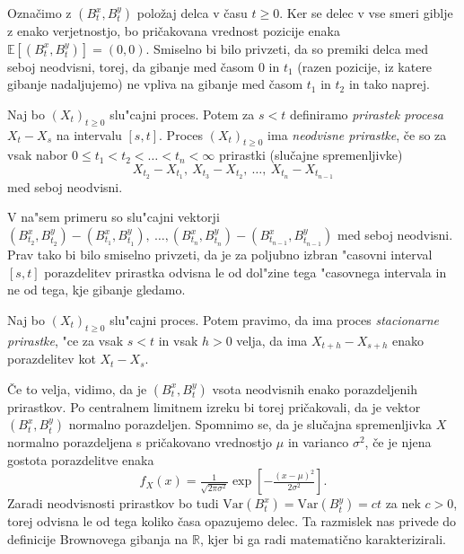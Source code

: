 \documentclass[twoside,11pt]{article}
\begin{document}
\noindent
Označimo z $\left(B^x_{t}, B^y_{t}\right)$ položaj delca v času $t \geq 0$. Ker se delec v vse 
smeri giblje z enako verjetnostjo, bo pričakovana vrednost pozicije enaka $\mathbb{E}\left[(B_t^x, B_t^y)\right] = (0, 0).$
Smiselno bi bilo privzeti, da so premiki delca med seboj neodvisni, torej, 
da gibanje med časom $0$ in $t_1$ (razen pozicije, iz katere gibanje nadaljujemo) ne vpliva na gibanje med časom $t_1$ in $t_2$ in tako naprej.

\begin{definicija}
    Naj bo $(X_t)_{t\geq0}$ slu"cajni proces. Potem za $s < t$ definiramo \textit{prirastek procesa} $X_t - X_s$ na 
    intervalu $[s, t]$. Proces $(X_t)_{t\geq0}$ ima \textit{neodvisne prirastke}, če so za vsak nabor 
    $0 \leq t_1 < t_2 < \ldots < t_n < \infty$ prirastki (slučajne spremenljivke)
    $$
        X_{t_2} - X_{t_1}, \ X_{t_3} - X_{t_2}, \ \ldots, \ X_{t_n} - X_{t_{n-1}}
    $$
    med seboj neodvisni.
\end{definicija}

\noindent
V na"sem primeru so slu"cajni vektorji $(B^x_{t_2}, B^y_{t_2}) - (B^x_{t_1}, B^y_{t_1}), \ \dots, (B^x_{t_n}, B^y_{t_n}) - (B^x_{t_{n-1}}, B^y_{t_{n-1}})$
med seboj neodvisni. Prav tako bi bilo smiselno privzeti, da je za poljubno izbran "casovni interval $[s, t]$
 porazdelitev prirastka odvisna le od dol"zine tega "casovnega intervala in ne od tega, kje gibanje gledamo. 

\begin{definicija}
    Naj bo $(X_t)_{t\geq0}$ slu"cajni proces. Potem pravimo, da ima proces \textit{stacionarne prirastke}, "ce za vsak $s < t$ in vsak $h > 0$ velja, da ima $X_{t+h} - X_{s+h}$ enako porazdelitev kot $X_t - X_s$.
\end{definicija}

\noindent
Če to velja, vidimo, da je $\left(B^x_{t}, B^y_{t}\right)$ vsota neodvisnih enako porazdeljenih prirastkov. Po centralnem 
limitnem izreku bi torej pričakovali, da je vektor $\left(B^x_{t}, B^y_{t}\right)$ normalno porazdeljen.
Spomnimo se, da je slučajna spremenljivka $X$ normalno porazdeljena s pričakovano vrednostjo $\mu$ in varianco $\sigma^2$, če
je njena gostota porazdelitve enaka
$$
    f_X(x) = \tfrac{1}{\sqrt{2\pi\sigma^2}}\exp\left[-\tfrac{(x-\mu)^2}{2\sigma^2}\right].
$$
Zaradi neodvisnosti prirastkov bo tudi $\text{Var}(B_t^x) = \text{Var}(B_t^y) = ct$ za nek $c>0$, torej odvisna le od tega koliko časa opazujemo delec.
Ta razmislek nas privede do definicije Brownovega gibanja na $\mathbb{R}$, kjer bi ga radi matematično karakterizirali.
\end{document}
